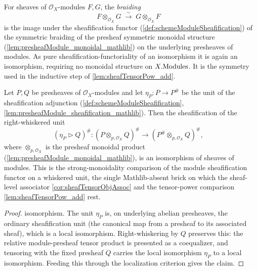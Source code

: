 \begin{definition}

  \label{def:tensorBraiding}
  For sheaves of \(\mathcal{O}_X\)-modules \(F, G\), the \emph{braiding}
  \[
    F \otimes_{\mathcal{O}_X} G \;\xrightarrow{\ \sim\ }\;
      G \otimes_{\mathcal{O}_X} F
  \]
  is the image under the sheafification functor
  (\cref{def:schemeModuleSheafification}) of the symmetric braiding of the
  presheaf symmetric monoidal structure (\cref{lem:presheafModule_monoidal_mathlib})
  on the underlying presheaves of modules. As pure sheafification-functoriality of
  an isomorphism it is again an isomorphism, requiring no monoidal structure on
  \(X.\mathrm{Modules}\). It is the symmetry used in the inductive step of
  \cref{lem:sheafTensorPow_add}.
\end{definition}

\begin{lemma}

  \label{lem:isIso_sheafification_whiskerRight_unit}
  Let \(P, Q\) be presheaves of \(\mathcal{O}_X\)-modules and let
  \(\eta_P : P \to P^{\#}\) be the unit of the sheafification adjunction
  (\cref{def:schemeModuleSheafification},
  \cref{lem:presheafModule_sheafification_mathlib}). Then the sheafification of the
  right-whiskered unit
  \[
    (\eta_P \rhd Q)^{\#} :
      (P \otimes_{p,\mathcal{O}_X} Q)^{\#} \longrightarrow
      (P^{\#} \otimes_{p,\mathcal{O}_X} Q)^{\#},
  \]
  where \(\otimes_{p,\mathcal{O}_X}\) is the presheaf monoidal product
  (\cref{lem:presheafModule_monoidal_mathlib}), is an isomorphism of sheaves of
  modules. This is the strong-monoidality comparison of the module sheafification
  functor on a whiskered unit, the single Mathlib-absent brick on which the
  sheaf-level associator \cref{cor:sheafTensorObjAssoc} and the tensor-power
  comparison \cref{lem:sheafTensorPow_add} rest.
\end{lemma}

\begin{proof}
  \leanok
  isomorphism. The unit \(\eta_P\) is, on underlying abelian presheaves, the
  ordinary sheafification unit (the canonical map from a presheaf to its associated sheaf), which is a local
  isomorphism. Right-whiskering by \(Q\) preserves this: the relative
  module-presheaf tensor product is presented as a coequalizer, and tensoring with
  the fixed presheaf \(Q\) carries the local isomorphism \(\eta_P\) to a local
  isomorphism. Feeding this through the localization criterion gives the claim.
\end{proof}

